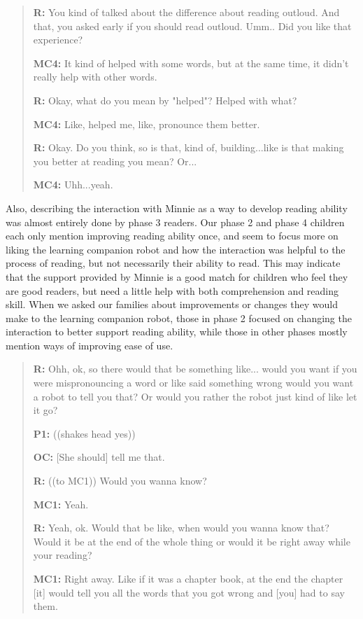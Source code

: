 \documentclass{sigchi}
\begin{document}
	\begin{quote}
		 \vspace{2mm}
		 \textbf{R:} You kind of talked about the difference about reading outloud. And that, you asked early if you should read outloud. Umm.. Did you like that experience?
		 		 
		 \textbf{MC4:} It kind of helped with some words, but at the same time, it didn't really help with other words.
		 
		 \textbf{R:} Okay, what do you mean by "helped"? Helped with what?
		 
		 \textbf{MC4:} Like, helped me, like, pronounce them better.
		  
		 \textbf{R:} Okay. Do you think, so is that, kind of, building...like is that making you better at reading you mean? Or...
		 
		 \textbf{MC4:} Uhh...yeah. 
		 
	\end{quote}

Also, describing the interaction with Minnie as a way to develop reading ability was almost entirely done by phase 3 readers. Our phase 2 and phase 4 children each only mention improving reading ability once, and seem to focus more on liking the learning companion robot and how the interaction was helpful to the process of reading, but not necessarily their ability to read. This may indicate that the support provided by Minnie is a good match for children who feel they are good readers, but need a little help with both comprehension and reading skill. When we asked our families about improvements or changes they would make to the learning companion robot, those in phase 2 focused on changing the interaction to better support reading ability, while those in other phases mostly mention ways of improving ease of use. 

	\begin{quote}
	 \textbf{R:} Ohh, ok, so there would that be something like... would you want if you were mispronouncing a word or like said something wrong would you want a robot to tell you that? Or would you rather the robot just kind of like let it go?
	 
	 \textbf{P1:} ((shakes head yes))
	 
	 \textbf{OC:} [She should] tell me that. 
	 
	 \textbf{R:} ((to MC1)) Would you wanna know?
	 
	 \textbf{MC1:} Yeah.
	 
	 \textbf{R:} Yeah, ok. Would that be like, when would you wanna know that? Would it be at the end of the whole thing or would it be right away while your reading?
	 
	 \textbf{MC1:} Right away. Like if it was a chapter book, at the end the chapter [it] would tell you all the words that you got wrong and [you] had to say them.
	\end{quote}
\end{document}
